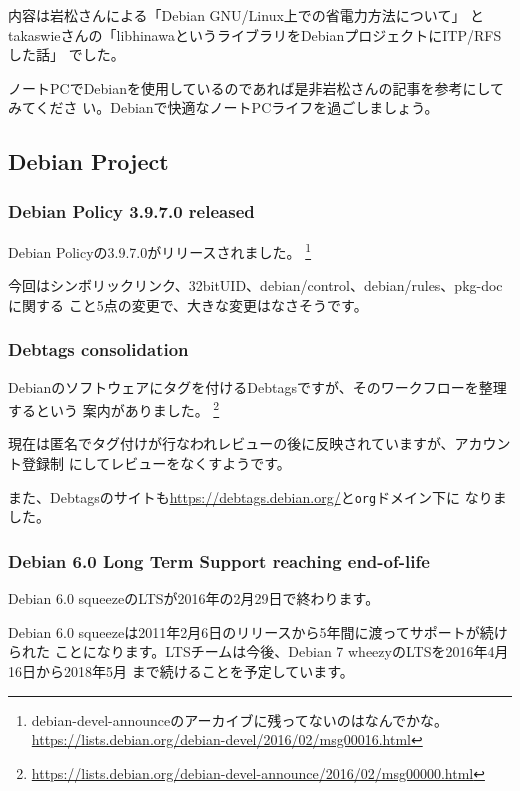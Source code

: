 \documentclass[mingoth,a4paper]{jsarticle}
\begin{document}
内容は岩松さんによる「Debian GNU/Linux上での省電力方法について」
とtakaswieさんの「libhinawaというライブラリをDebianプロジェクトにITP/RFSした話」
でした。

ノートPCでDebianを使用しているのであれば是非岩松さんの記事を参考にしてみてくださ
い。Debianで快適なノートPCライフを過ごしましょう。

\subsection{Debian Project}

\subsubsection {Debian Policy 3.9.7.0 released}

Debian Policyの3.9.7.0がリリースされました。
\footnote{debian-devel-announceのアーカイブに残ってないのはなんでかな。\\
\url{https://lists.debian.org/debian-devel/2016/02/msg00016.html}}

今回はシンボリックリンク、32bitUID、debian/control、debian/rules、pkg-docに関する
こと5点の変更で、大きな変更はなさそうです。

\subsubsection {Debtags consolidation}

Debianのソフトウェアにタグを付けるDebtagsですが、そのワークフローを整理するという
案内がありました。
\footnote{\url{https://lists.debian.org/debian-devel-announce/2016/02/msg00000.html}}

現在は匿名でタグ付けが行なわれレビューの後に反映されていますが、アカウント登録制
にしてレビューをなくすようです。

また、Debtagsのサイトも\url{https://debtags.debian.org/}と{\tt org}ドメイン下に
なりました。


\subsubsection{Debian 6.0 Long Term Support reaching end-of-life}

Debian 6.0 squeezeのLTSが2016年の2月29日で終わります。

Debian 6.0 squeezeは2011年2月6日のリリースから5年間に渡ってサポートが続けられた
ことになります。LTSチームは今後、Debian 7 wheezyのLTSを2016年4月16日から2018年5月
まで続けることを予定しています。
\end{document}
